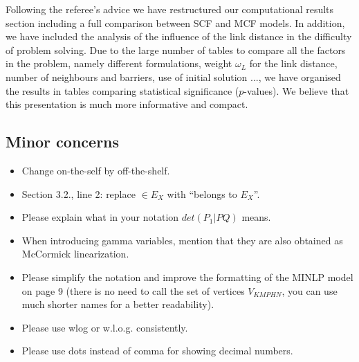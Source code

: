 \documentclass{article}
\newenvironment{reviewer}{\setcounter{pointcounter}{1}}{}
\newcommand{\point}{\text{{\selectfont \thepointcounter} \stepcounter{pointcounter}}}
\newcommand{\JP}[1]{{\color{black}#1}}
\begin{document}
\begin{reviewer}
		\begin{tcolorbox}[breakable,enhanced,coltitle=black,colback=green!5!white,colframe=green!75!black,title=\textbf{Answer R2.\point},borderline={1pt}{0pt}{black},boxrule=0pt]
			\JP{
				Following the referee's advice we have  restructured our computational results section including a full comparison between SCF and MCF models. In addition, we have included the analysis of the influence of the link distance in the difficulty of problem solving. Due to the large number of tables to compare all the factors in the problem, namely different formulations, weight $\omega_L$ for the link distance, number of neighbours and barriers, use of initial solution ..., we have organised the results in tables comparing statistical significance ($p$-values). We believe that this presentation is much more informative and compact.}
		\end{tcolorbox}
	
		\subsection*{Minor concerns}
		
		\begin{itshape}
			\begin{itemize}
				\item Change on-the-self by off-the-shelf.
				\item Section 3.2., line 2: replace $\in E_X$ with ``belongs to $E_X$''.
				\item Please explain what in your notation $det(P_1|PQ)$ means.
				\item When introducing gamma variables, mention that they are also obtained as McCormick linearization.
				\item Please simplify the notation and improve the formatting of the MINLP model on page 9 (there is no need to call the set of vertices $V_{KMPHN}$, you can use much shorter names for a better readability).
				\item Please use wlog or w.l.o.g. consistently.
				\item Please use dots instead of comma for showing decimal numbers.
			\end{itemize}
		\end{itshape}
	

\end{reviewer}
\end{document}
